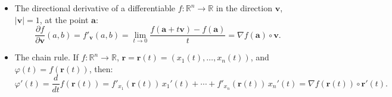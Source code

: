 \documentclass{article}
\newcommand{\Tr}[2]{#1}
\newcommand\dd[2]{\frac{\partial #1}{\partial #2}}
\newcommand\bda{\mathbf a}
\newcommand\bdh{\mathbf h}
\newcommand\bdr{\mathbf r}
\newcommand\bdv{\mathbf v}
\newcommand\bdx{\mathbf x}
\def\Rone{{\mathbb R}}
\begin{document}
\begin{itemize}
\item %
  \Tr{The directional derivative of a differentiable}
     {Riktningsderivatan av en differentierbar}
$f:\Rone^n\to\Rone$
\Tr{in the direction}
   {i riktningen}
$\bdv$, $|\bdv|=1$,
\Tr{at the point}
   {i punkten}
$\bda$:
%
 $$
 \dd f{\bdv}(a,b)=f'_{\bdv}(a,b)=\lim_{t\to0}\frac{f(\bda+t\bdv)-f(\bda)}{t}
                 =\nabla f(\bda) \circ \bdv.
 $$


\item %
  \Tr{The chain rule. If}
     {Kedjeregeln. Om}
  $f:\Rone^n\to\Rone$,
  $\bdr=\bdr(t)=(x_1(t),\dots, x_n(t))$, and $\varphi(t)=f(\bdr(t))$,
  \Tr{then:}
     {då är}
  $$
  \varphi'(t)=\frac{d}{dt} f(\bdr(t))
          =f'_{x_1}(\bdr(t))\,x_1'(t)+\cdots +f'_{x_n}(\bdr(t))\,x_n'(t)
          =\nabla f(\bdr(t))\circ\bdr'(t).
  $$


\end{itemize}
\end{document}
